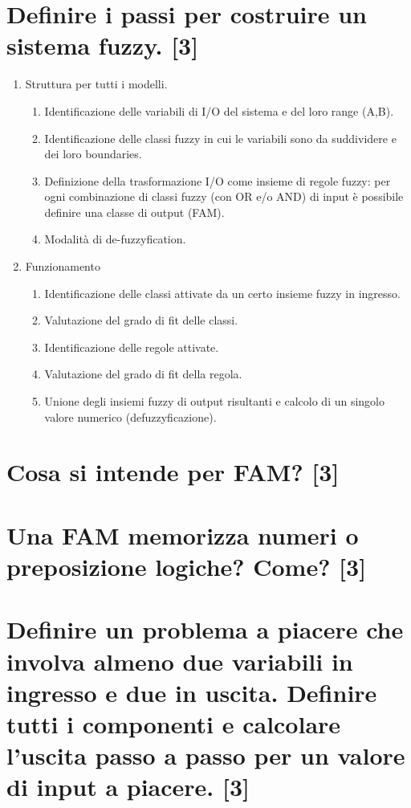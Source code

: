 \documentclass[\main/main.tex]{subfiles}
\begin{document}
\section{Definire i passi per costruire un sistema fuzzy. [3]}
\begin{enumerate}
\item Struttura per tutti i modelli.
\begin{enumerate}
\item Identificazione delle variabili di I/O del sistema e del loro range (A,B).
\item Identificazione delle classi fuzzy in cui le variabili sono da suddividere e dei loro boundaries.
\item Definizione della trasformazione I/O come insieme di regole fuzzy: per ogni combinazione di classi fuzzy (con OR e/o AND) di input è possibile definire una classe di output (FAM).
\item Modalità di de-fuzzyfication.
\end{enumerate}
\item Funzionamento
\begin{enumerate}
\item Identificazione delle classi attivate da un certo insieme fuzzy in ingresso.
\item Valutazione del grado di fit delle classi.
\item Identificazione delle regole attivate.
\item Valutazione del grado di fit della regola.
\item Unione degli insiemi fuzzy di output risultanti e calcolo di un singolo valore numerico (defuzzyficazione).
\end{enumerate}
\end{enumerate}
\section{Cosa si intende per FAM? [3]}
\section{Una FAM memorizza numeri o preposizione logiche? Come? [3]}
\section{Definire un problema a piacere che involva almeno due variabili in ingresso e due in uscita. Definire tutti i componenti e calcolare l'uscita passo a passo per un valore di input a piacere. [3]}
\end{document}

